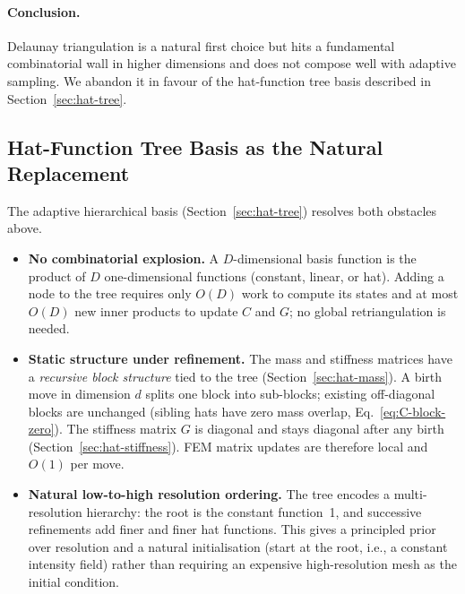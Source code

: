 \documentclass[11pt]{article}
\begin{document}
\paragraph{Conclusion.}
Delaunay triangulation is a natural first choice but hits a fundamental
combinatorial wall in higher dimensions and does not compose well with adaptive
sampling.  We abandon it in favour of the hat-function tree basis described in
Section~\ref{sec:hat-tree}.

\subsection{Hat-Function Tree Basis as the Natural Replacement}
\label{sec:lesson-tree-basis}

The adaptive hierarchical basis (Section~\ref{sec:hat-tree}) resolves both
obstacles above.

\begin{itemize}
  \item \textbf{No combinatorial explosion.}
    A $D$-dimensional basis function is the product of $D$ one-dimensional
    functions (constant, linear, or hat).  Adding a node to the tree requires
    only $O(D)$ work to compute its states and at most $O(D)$ new inner
    products to update $C$ and $G$; no global retriangulation is needed.
  \item \textbf{Static structure under refinement.}
    The mass and stiffness matrices have a \emph{recursive block structure}
    tied to the tree (Section~\ref{sec:hat-mass}).  A birth move in dimension
    $d$ splits one block into sub-blocks; existing off-diagonal blocks are
    unchanged (sibling hats have zero mass overlap, Eq.~\eqref{eq:C-block-zero}).
    The stiffness matrix $G$ is diagonal and stays diagonal after any birth
    (Section~\ref{sec:hat-stiffness}).  FEM matrix updates are therefore local
    and $O(1)$ per move.
  \item \textbf{Natural low-to-high resolution ordering.}
    The tree encodes a multi-resolution hierarchy: the root is the constant
    function~1, and successive refinements add finer and finer hat functions.
    This gives a principled prior over resolution and a natural initialisation
    (start at the root, i.e., a constant intensity field) rather than requiring
    an expensive high-resolution mesh as the initial condition.
\end{itemize}
\end{document}
